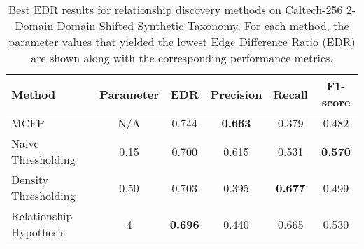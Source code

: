 \begin{table}[ht]
\centering
\caption{Best EDR results for relationship discovery methods on Caltech-256 2-Domain Domain Shifted Synthetic Taxonomy. For each method, the parameter values that yielded the lowest Edge Difference Ratio (EDR) are shown along with the corresponding performance metrics.}
\label{tab:relationship_methods_domain_shifted_results}
\begin{tabular}{lccccc}
\toprule
Method & Parameter & EDR & Precision & Recall & F1-score \\
\midrule
MCFP & N/A & 0.744 & \textbf{0.663} & 0.379 & 0.482 \\
Naive Thresholding & 0.15 & 0.700 & 0.615 & 0.531 & \textbf{0.570} \\
Density Thresholding & 0.50 & 0.703 & 0.395 & \textbf{0.677} & 0.499 \\
Relationship Hypothesis & 4 & \textbf{0.696} & 0.440 & 0.665 & 0.530 \\
\bottomrule
\end{tabular}
\end{table}
